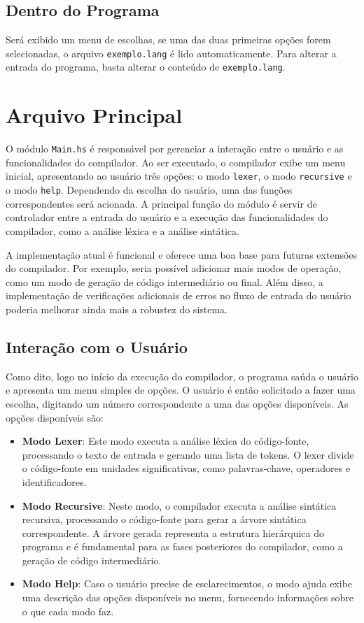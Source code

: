\documentclass{article}
\begin{document}
\subsection{Dentro do Programa}
Será exibido um menu de escolhas, se uma das duas primeiras opções forem selecionadas, o arquivo \texttt{exemplo.lang} é lido automaticamente. Para alterar a entrada do programa, basta alterar o conteúdo de \texttt{exemplo.lang}.

\section{Arquivo Principal}

O módulo \texttt{Main.hs} é responsável por gerenciar a interação entre o usuário e as funcionalidades do compilador. Ao ser executado, o compilador exibe um menu inicial, apresentando ao usuário três opções: o modo \texttt{lexer}, o modo \texttt{recursive} e o modo \texttt{help}. Dependendo da escolha do usuário, uma das funções correspondentes será acionada. A principal função do módulo é servir de controlador entre a entrada do usuário e a execução das funcionalidades do compilador, como a análise léxica e a análise sintática.

A implementação atual é funcional e oferece uma boa base para futuras extensões do compilador. Por exemplo, seria possível adicionar mais modos de operação, como um modo de geração de código intermediário ou final. Além disso, a implementação de verificações adicionais de erros no fluxo de entrada do usuário poderia melhorar ainda mais a robustez do sistema.

\subsection{Interação com o Usuário}

Como dito, logo no início da execução do compilador, o programa saúda o usuário e apresenta um menu simples de opções. O usuário é então solicitado a fazer uma escolha, digitando um número correspondente a uma das opções disponíveis. As opções disponíveis são:

\begin{itemize}
    \item \textbf{Modo Lexer}: Este modo executa a análise léxica do código-fonte, processando o texto de entrada e gerando uma lista de tokens. O lexer divide o código-fonte em unidades significativas, como palavras-chave, operadores e identificadores.
    \item \textbf{Modo Recursive}: Neste modo, o compilador executa a análise sintática recursiva, processando o código-fonte para gerar a árvore sintática correspondente. A árvore gerada representa a estrutura hierárquica do programa e é fundamental para as fases posteriores do compilador, como a geração de código intermediário.
    \item \textbf{Modo Help}: Caso o usuário precise de esclarecimentos, o modo ajuda exibe uma descrição das opções disponíveis no menu, fornecendo informações sobre o que cada modo faz.
\end{itemize}
\end{document}
